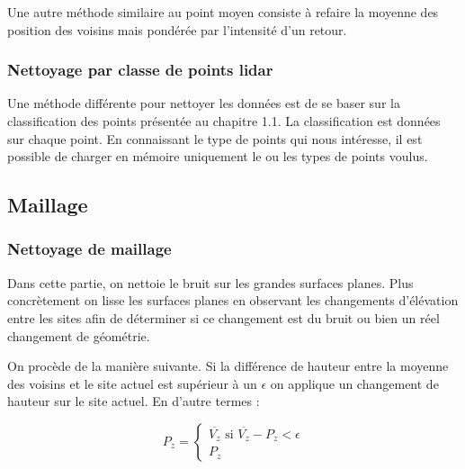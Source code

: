 Une autre méthode similaire au point moyen consiste à refaire la moyenne des
position des voisins mais pondérée par l'intensité d'un retour.

\subsubsection{Nettoyage par classe de points lidar}

Une méthode différente pour nettoyer les données est de se baser sur la 
classification des points présentée au chapitre 1.1.
La classification est données sur chaque point.
En connaissant le type de points qui nous intéresse, il est possible de charger
en mémoire uniquement le ou les types de points voulus. 

\subsection{Maillage}
\subsubsection{Nettoyage de maillage}

Dans cette partie, on nettoie le bruit sur les grandes surfaces planes.
Plus concrètement on lisse les surfaces planes en observant les changements
d'élévation entre les sites afin de déterminer si ce changement est du bruit ou
bien un réel changement de géométrie.

On procède de la manière suivante. 
Si la différence de hauteur entre la moyenne des voisins et le site actuel est
supérieur à un $\epsilon$ on applique un changement de hauteur sur le site
actuel.
En d'autre termes :

$$
P_z = 
\left \{
	\begin{array}{l}
		\overline{V_z}\text{ si } \overline{V_z} - P_z < \epsilon \\ 
		P_z 
	\end{array}
\right .
$$

